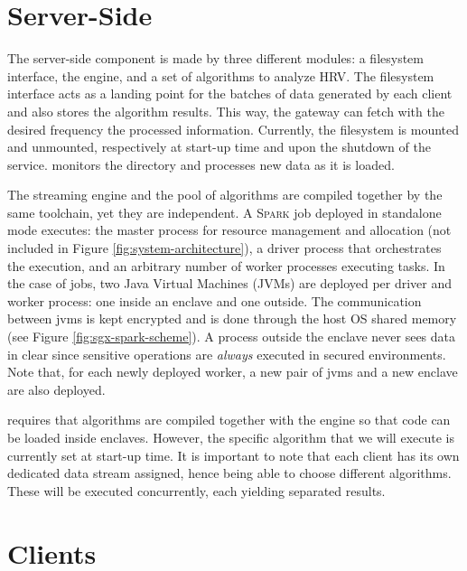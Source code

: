 \section{Server-Side} \label{sec:server}

The server-side component is made by three different modules: a filesystem interface, the \sgxspark engine, and a set of algorithms to analyze HRV. 
The filesystem interface acts as a landing point for the batches of data generated by each client and also stores the algorithm results.
This way, the gateway can fetch with the desired frequency the processed information.
Currently, the filesystem is mounted and unmounted, respectively at start-up time and upon the shutdown of the service. 
\sgxspark monitors the directory and processes new data as it is loaded.

The streaming engine and the pool of algorithms are compiled together by the same toolchain, yet they are independent. 
A \textsc{Spark} job deployed in standalone mode executes: the master process for resource management and allocation (not included in Figure \ref{fig:system-architecture}), a driver process that orchestrates the execution, and an arbitrary number of worker processes executing tasks.
In the case of \sgxspark jobs, two Java Virtual Machines (JVMs) are deployed per driver and worker process: one inside an enclave and one outside.
The communication between \acrshort{jvm}s is kept encrypted and is done through the host OS shared memory (see Figure \ref{fig:sgx-spark-scheme}).
A process outside the enclave never sees data in clear since sensitive operations are \emph{always} executed in secured environments.
Note that, for each newly deployed worker, a new pair of \acrshort{jvm}s and a new enclave are also deployed.

\sgxspark requires that algorithms are compiled together with the engine so that code can be loaded inside enclaves.
However, the specific algorithm that we will execute is currently set at start-up time.
It is important to note that each client has its own dedicated data stream assigned, hence being able to choose different algorithms.
These will be executed concurrently, each yielding separated results. 

\section{Clients} \label{sec:clients}

